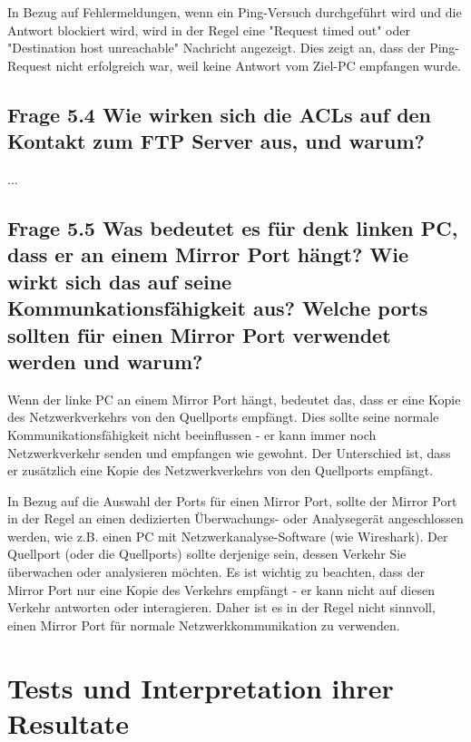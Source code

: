 \documentclass{article}
\begin{document}
In Bezug auf Fehlermeldungen, wenn ein Ping-Versuch durchgeführt wird und die Antwort blockiert wird, wird in der Regel eine "Request timed out" oder "Destination host unreachable" Nachricht angezeigt. Dies zeigt an, dass der Ping-Request nicht erfolgreich war, weil keine Antwort vom Ziel-PC empfangen wurde.\\

\subsection*{Frage 5.4 \normalfont Wie wirken sich die ACLs auf den Kontakt zum FTP Server aus, und warum?} 
...\\

\subsection*{Frage 5.5 \normalfont Was bedeutet es für denk linken PC, dass er an einem Mirror Port hängt? Wie wirkt sich das auf seine Kommunkationsfähigkeit aus? Welche ports sollten für einen Mirror Port verwendet werden und warum?}
Wenn der linke PC an einem Mirror Port hängt, bedeutet das, dass er eine Kopie des Netzwerkverkehrs von den Quellports empfängt. Dies sollte seine normale Kommunikationsfähigkeit nicht beeinflussen - er kann immer noch Netzwerkverkehr senden und empfangen wie gewohnt. Der Unterschied ist, dass er zusätzlich eine Kopie des Netzwerkverkehrs von den Quellports empfängt.

In Bezug auf die Auswahl der Ports für einen Mirror Port, sollte der Mirror Port in der Regel an einen dedizierten Überwachungs- oder Analysegerät angeschlossen werden, wie z.B. einen PC mit Netzwerkanalyse-Software (wie Wireshark). Der Quellport (oder die Quellports) sollte derjenige sein, dessen Verkehr Sie überwachen oder analysieren möchten. Es ist wichtig zu beachten, dass der Mirror Port nur eine Kopie des Verkehrs empfängt - er kann nicht auf diesen Verkehr antworten oder interagieren. Daher ist es in der Regel nicht sinnvoll, einen Mirror Port für normale Netzwerkkommunikation zu verwenden.\\

\pagebreak
\section{Tests und Interpretation ihrer Resultate}
\end{document}
